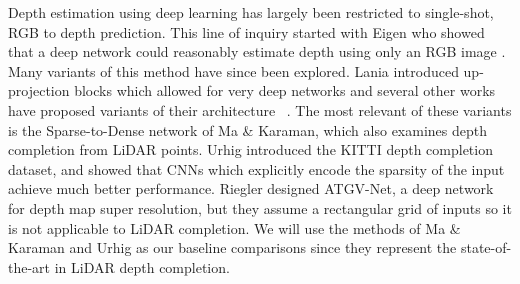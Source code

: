 Depth estimation using deep learning has largely been restricted to single-shot, RGB to depth prediction. This line of inquiry started with Eigen \etal who showed that a deep network could reasonably estimate depth using only an RGB image \cite{eigen2014depth}. Many variants of this method have since been explored\cite{kuznietsov2017semi,godard2016unsupervised,liu2015deep}. Lania \etal introduced up-projection blocks which allowed for very deep networks and several other works have proposed variants of their architecture ~\cite{laina2016deeper}. The most relevant of these variants is the Sparse-to-Dense network of Ma \& Karaman, which also examines depth completion from LiDAR points\cite{sparsetodense}. Urhig \etal introduced the KITTI depth completion dataset, and showed that CNNs which explicitly encode the sparsity of the input achieve much better performance\cite{uhrig}. Riegler \etal designed ATGV-Net, a deep network for depth map super resolution, but they assume a rectangular grid of inputs so it is not applicable to LiDAR completion\cite{riegler}. We will use the methods of Ma \& Karaman and Urhig \etal as our baseline comparisons since they represent the state-of-the-art in LiDAR depth completion.
